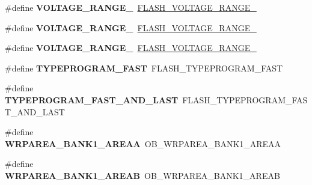 \begin{DoxyCompactItemize}
\#define {\bfseries V\+O\+L\+T\+A\+G\+E\+\_\+\+R\+A\+N\+G\+E\+\_}~\hyperlink{group___f_l_a_s_h_ex___voltage___range_gad047be2bc7aa9be946b5b0c6b3062ef3}{F\+L\+A\+S\+H\+\_\+\+V\+O\+L\+T\+A\+G\+E\+\_\+\+R\+A\+N\+G\+E\+\_}
\item 
\mbox{\label{group___h_a_l___f_l_a_s_h___aliased___defines_ga45c6cc06a75f9dfd18e3d182cbe1387b}} 
\#define {\bfseries V\+O\+L\+T\+A\+G\+E\+\_\+\+R\+A\+N\+G\+E\+\_}~\hyperlink{group___f_l_a_s_h_ex___voltage___range_ga50950407a789684eec9216f49e0831a0}{F\+L\+A\+S\+H\+\_\+\+V\+O\+L\+T\+A\+G\+E\+\_\+\+R\+A\+N\+G\+E\+\_}
\item 
\mbox{\label{group___h_a_l___f_l_a_s_h___aliased___defines_ga98497e19f090f03d71a1537fbcfebfe9}} 
\#define {\bfseries V\+O\+L\+T\+A\+G\+E\+\_\+\+R\+A\+N\+G\+E\+\_}~\hyperlink{group___f_l_a_s_h_ex___voltage___range_gabf8037a482f18815c5a67f287223a658}{F\+L\+A\+S\+H\+\_\+\+V\+O\+L\+T\+A\+G\+E\+\_\+\+R\+A\+N\+G\+E\+\_}
\item 
\mbox{\label{group___h_a_l___f_l_a_s_h___aliased___defines_gae3b03b62939464528d8a52b034135ea2}} 
\#define {\bfseries T\+Y\+P\+E\+P\+R\+O\+G\+R\+A\+M\+\_\+\+F\+A\+ST}~F\+L\+A\+S\+H\+\_\+\+T\+Y\+P\+E\+P\+R\+O\+G\+R\+A\+M\+\_\+\+F\+A\+ST
\item 
\mbox{\label{group___h_a_l___f_l_a_s_h___aliased___defines_gab52dbb436e471071f4700f9bafcb0cef}} 
\#define {\bfseries T\+Y\+P\+E\+P\+R\+O\+G\+R\+A\+M\+\_\+\+F\+A\+S\+T\+\_\+\+A\+N\+D\+\_\+\+L\+A\+ST}~F\+L\+A\+S\+H\+\_\+\+T\+Y\+P\+E\+P\+R\+O\+G\+R\+A\+M\+\_\+\+F\+A\+S\+T\+\_\+\+A\+N\+D\+\_\+\+L\+A\+ST
\item 
\mbox{\label{group___h_a_l___f_l_a_s_h___aliased___defines_ga4d57e7a32711f223077cc45a55b4d333}} 
\#define {\bfseries W\+R\+P\+A\+R\+E\+A\+\_\+\+B\+A\+N\+K1\+\_\+\+A\+R\+E\+AA}~O\+B\+\_\+\+W\+R\+P\+A\+R\+E\+A\+\_\+\+B\+A\+N\+K1\+\_\+\+A\+R\+E\+AA
\item 
\mbox{\label{group___h_a_l___f_l_a_s_h___aliased___defines_ga073be154a6602831a813316fa4fb17ca}} 
\#define {\bfseries W\+R\+P\+A\+R\+E\+A\+\_\+\+B\+A\+N\+K1\+\_\+\+A\+R\+E\+AB}~O\+B\+\_\+\+W\+R\+P\+A\+R\+E\+A\+\_\+\+B\+A\+N\+K1\+\_\+\+A\+R\+E\+AB

\end{DoxyCompactItemize}
